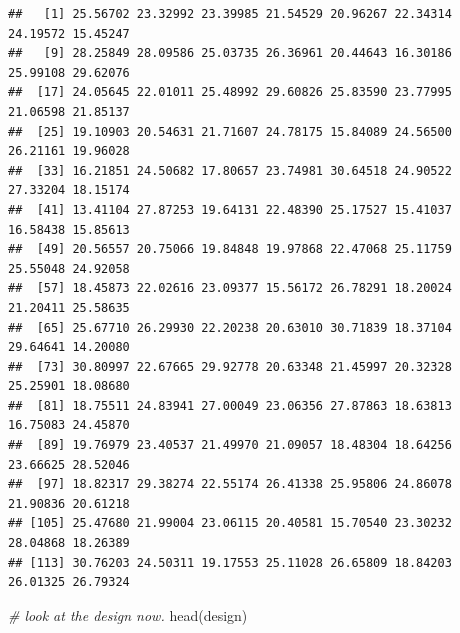 \documentclass[
]{book}
\newenvironment{Shaded}{\begin{snugshade}}{\end{snugshade}}
\newcommand{\CommentTok}[1]{\textcolor[rgb]{0.56,0.35,0.01}{\textit{#1}}}
\newcommand{\DecValTok}[1]{\textcolor[rgb]{0.00,0.00,0.81}{#1}}
\newcommand{\FunctionTok}[1]{\textcolor[rgb]{0.00,0.00,0.00}{#1}}
\newcommand{\NormalTok}[1]{#1}
\newcommand{\OtherTok}[1]{\textcolor[rgb]{0.56,0.35,0.01}{#1}}
\newcommand{\SpecialCharTok}[1]{\textcolor[rgb]{0.00,0.00,0.00}{#1}}
\newcommand{\StringTok}[1]{\textcolor[rgb]{0.31,0.60,0.02}{#1}}
\begin{document}
\begin{Shaded}
\end{Shaded}

\begin{verbatim}
##   [1] 25.56702 23.32992 23.39985 21.54529 20.96267 22.34314 24.19572 15.45247
##   [9] 28.25849 28.09586 25.03735 26.36961 20.44643 16.30186 25.99108 29.62076
##  [17] 24.05645 22.01011 25.48992 29.60826 25.83590 23.77995 21.06598 21.85137
##  [25] 19.10903 20.54631 21.71607 24.78175 15.84089 24.56500 26.21161 19.96028
##  [33] 16.21851 24.50682 17.80657 23.74981 30.64518 24.90522 27.33204 18.15174
##  [41] 13.41104 27.87253 19.64131 22.48390 25.17527 15.41037 16.58438 15.85613
##  [49] 20.56557 20.75066 19.84848 19.97868 22.47068 25.11759 25.55048 24.92058
##  [57] 18.45873 22.02616 23.09377 15.56172 26.78291 18.20024 21.20411 25.58635
##  [65] 25.67710 26.29930 22.20238 20.63010 30.71839 18.37104 29.64641 14.20080
##  [73] 30.80997 22.67665 29.92778 20.63348 21.45997 20.32328 25.25901 18.08680
##  [81] 18.75511 24.83941 27.00049 23.06356 27.87863 18.63813 16.75083 24.45870
##  [89] 19.76979 23.40537 21.49970 21.09057 18.48304 18.64256 23.66625 28.52046
##  [97] 18.82317 29.38274 22.55174 26.41338 25.95806 24.86078 21.90836 20.61218
## [105] 25.47680 21.99004 23.06115 20.40581 15.70540 23.30232 28.04868 18.26389
## [113] 30.76203 24.50311 19.17553 25.11028 26.65809 18.84203 26.01325 26.79324
\end{verbatim}

\begin{Shaded}
\begin{Highlighting}[]
\CommentTok{\# look at the design now.}
\FunctionTok{head}\NormalTok{(design)}
\end{Highlighting}
\end{Shaded}
\end{document}
